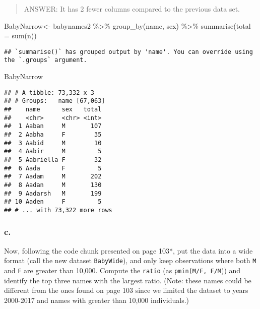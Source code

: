 \documentclass[
]{article}
\newenvironment{Shaded}{\begin{snugshade}}{\end{snugshade}}
\newcommand{\AttributeTok}[1]{\textcolor[rgb]{0.77,0.63,0.00}{#1}}
\newcommand{\FunctionTok}[1]{\textcolor[rgb]{0.00,0.00,0.00}{#1}}
\newcommand{\NormalTok}[1]{#1}
\newcommand{\OtherTok}[1]{\textcolor[rgb]{0.56,0.35,0.01}{#1}}
\newcommand{\SpecialCharTok}[1]{\textcolor[rgb]{0.00,0.00,0.00}{#1}}
\begin{document}
\begin{quote}
ANSWER: It has 2 fewer columns compared to the previous data set.
\end{quote}

\begin{Shaded}
\begin{Highlighting}[]
\NormalTok{BabyNarrow}\OtherTok{\textless{}{-}}\NormalTok{ babynames2 }\SpecialCharTok{\%\textgreater{}\%}
\FunctionTok{group\_by}\NormalTok{(name, sex) }\SpecialCharTok{\%\textgreater{}\%}
\FunctionTok{summarise}\NormalTok{(}\AttributeTok{total =} \FunctionTok{sum}\NormalTok{(n))}
\end{Highlighting}
\end{Shaded}

\begin{verbatim}
## `summarise()` has grouped output by 'name'. You can override using the `.groups` argument.
\end{verbatim}

\begin{Shaded}
\begin{Highlighting}[]
\NormalTok{BabyNarrow}
\end{Highlighting}
\end{Shaded}

\begin{verbatim}
## # A tibble: 73,332 x 3
## # Groups:   name [67,063]
##    name      sex   total
##    <chr>     <chr> <int>
##  1 Aaban     M       107
##  2 Aabha     F        35
##  3 Aabid     M        10
##  4 Aabir     M         5
##  5 Aabriella F        32
##  6 Aada      F         5
##  7 Aadam     M       202
##  8 Aadan     M       130
##  9 Aadarsh   M       199
## 10 Aaden     F         5
## # ... with 73,322 more rows
\end{verbatim}

\hypertarget{c.-1}{%
\subsubsection{c.}\label{c.-1}}

Now, following the code chunk presented on page 103*, put the data into
a wide format (call the new dataset \texttt{BabyWide}), and only keep
observations where both \texttt{M} and \texttt{F} are greater than
10,000. Compute the \texttt{ratio} (as \texttt{pmin(M/F,\ F/M})) and
identify the top three names with the largest ratio. (Note: these names
could be different from the ones found on page 103 since we limited the
dataset to years 2000-2017 and names with greater than 10,000
individuals.)
\end{document}
